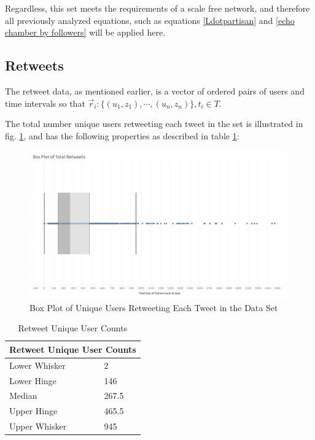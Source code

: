 \documentclass[preprint,review,12pt]{elsarticle}
\begin{document}
Regardless, this set meets the requirements of a scale free network, and therefore all previously analyzed equations, such as equations \ref{Ldotpartisan} and \ref{echo chamber by followers} will be applied here.

\subsection{Retweets}
The retweet data, as mentioned earlier, is a vector of ordered pairs of users and time intervals so that $\vec{r}_i:\{(u_1,z_1), \cdots, (u_n,z_n)\}, t_i \in T$.

The total number unique users retweeting each tweet in the set is illustrated in fig. \ref{fig:Unique Retweeters}, and has the following properties as described in table \ref{Retweet Unique User Counts}:
\begin{figure}[h]
 \centering
  \includegraphics[width=12cm]{Retweet Box Plot.png}
  \caption{Box Plot of Unique Users Retweeting Each Tweet in the Data Set}\label{fig:Unique Retweeters}
 \end{figure}
 
\begin{table}[h]
\centering
\begin{tabular}{ |p{3cm}|p{3cm}|  }
\hline
\multicolumn{2}{|c|}{Retweet Unique User Counts} \\
\hline
Lower Whisker & 2\\
Lower Hinge & 146 \\
Median & 267.5 \\
Upper Hinge & 465.5 \\
Upper Whisker & 945 \\
\hline
\end{tabular}
\caption{Retweet Unique User Counts}
\label{Retweet Unique User Counts}
\end{table}
\end{document}
